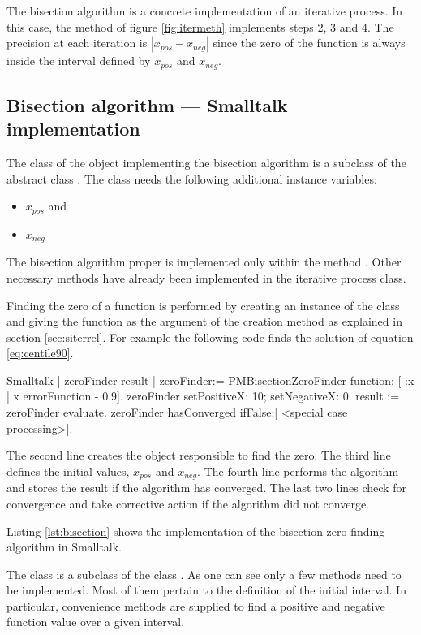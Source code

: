The bisection algorithm is a concrete implementation of an
iterative process. In this case, the method  of figure \ref{fig:itermeth} implements steps
2, 3 and 4. The precision at each iteration is $\left|
x_{pos}-x_{neg}\right|$ since the zero
of the function is always inside the interval defined by
$x_{pos}$ and $x_{neg}$.

\subsection{Bisection algorithm --- Smalltalk  implementation}

The class of the object implementing the bisection algorithm is a subclass of the abstract class .
The class  needs the following additional instance variables:
\begin{itemize}
  \item {} $x_{pos}$ and
  \item {} $x_{neg}$
\end{itemize}
The bisection algorithm proper is implemented only within the method .
Other necessary methods have already been implemented in the iterative process class.

Finding the zero of a function is performed by creating an
instance of the class  and giving the
function as the argument of the creation method as explained in
section \ref{sec:siterrel}. For example the following code finds
the solution of equation \ref{eq:centile90}.
\begin{displaycode}{Smalltalk}
| zeroFinder result |
zeroFinder:= PMBisectionZeroFinder function: [ :x | x errorFunction - 0.9].
zeroFinder setPositiveX: 10; setNegativeX: 0.
result := zeroFinder evaluate. zeroFinder
hasConverged
   ifFalse:[ <special case processing>].
\end{displaycode}
The second line creates the object responsible to find the zero.
The third line defines the initial values, $x_{pos}$ and $x_{neg}$.
The fourth line performs the algorithm and stores the result if the algorithm has converged.
The last two lines check for convergence and take corrective action if the algorithm did not converge.

Listing \ref{lst:bisection} shows the implementation of the bisection zero finding algorithm in Smalltalk.

The class  is a subclass of the class . As one can see only a few methods need to be implemented.
Most of them pertain to the definition of the initial interval.
In particular, convenience methods are supplied to find a positive and negative function value over a given interval.

